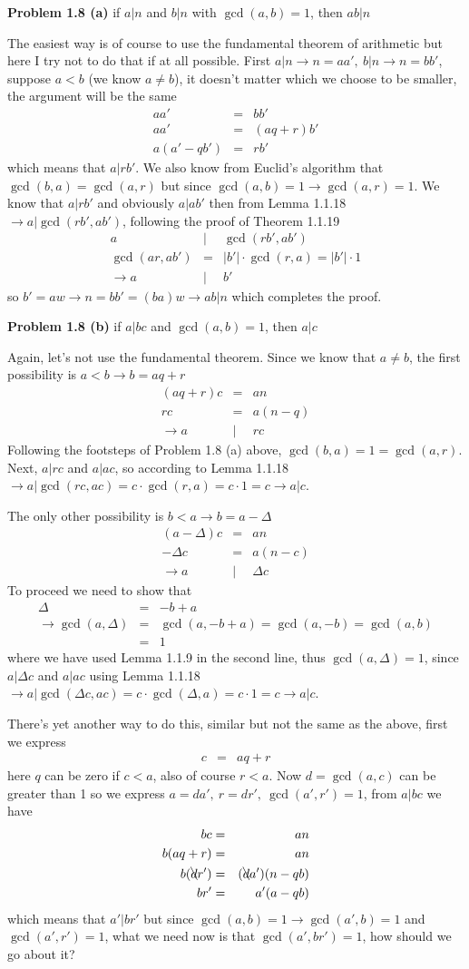 \documentclass[aps,preprint,preprintnumbers,nofootinbib,showpacs,prd]{revtex4-1}
\newcommand{\nbea}{\begin{eqnarray*}}
\newcommand{\neea}{\end{eqnarray*}}
\begin{document}
{\bf Problem 1.8 (a)} if $a|n$ and $b|n$ with $\gcd(a,b)=1$, then $ab|n$

The easiest way is of course to use the fundamental theorem of arithmetic but here I try not to do that if at all possible. First $a|n \to n = aa',~b|n \to n = bb'$, suppose $a < b$ (we know $a \neq b$), it doesn't matter which we choose to be smaller, the argument will be the same
%
\nbea
aa' & = & bb' \\
aa' & = & (aq + r) b' \\
a (a' - qb') & = & rb'
\neea
%
which means that $a | rb'$. We also know from Euclid's algorithm that $\gcd(b,a) = \gcd(a, r)$ but since $\gcd(a,b) = 1 \to \gcd(a,r)=1$. We know that $a|rb'$ and obviously $a|ab'$ then from Lemma 1.1.18 $\to a|\gcd(rb',ab')$, following the proof of Theorem 1.1.19
%
\nbea
a & | & \gcd(rb',ab') \\
\gcd(ar,ab') & = & |b'| \cdot \gcd(r,a) = |b'| \cdot 1 \\
\to a & | & b'
\neea
%
so $b' = a w \to n = bb' = (b a) w \to ab | n$ which completes the proof.

{\bf Problem 1.8 (b)} if $a|bc$ and $\gcd(a,b) = 1$, then $a|c$

Again, let's not use the fundamental theorem. Since we know that $a \neq b$, the first possibility is $a < b \to b = aq + r$
%
\nbea
(aq+r)c & = & an \\
rc & = & a(n-q) \\
\to a & | & rc
\neea
%
Following the footsteps of Problem 1.8 (a) above, $\gcd(b,a) = 1 = \gcd(a,r)$. Next, $a|rc$ and $a|ac$, so according to Lemma 1.1.18 $\to a|\gcd(rc,ac) = c \cdot \gcd(r,a) = c \cdot 1 = c \to a | c$.

The only other possibility is $b < a \to b = a - \Delta$
%
\nbea
(a - \Delta)c & = & an \\
-\Delta c & = & a(n-c) \\
\to a & | & \Delta c
\neea
%
To proceed we need to show that
%
\nbea
\Delta & = & - b + a\\
\to \gcd(a,\Delta) & = & \gcd(a, - b + a) = \gcd(a,-b) = \gcd(a,b)\\
& = & 1
\neea
%
where we have used Lemma 1.1.9 in the second line, thus $\gcd(a,\Delta) = 1$, since $a|\Delta c$ and $a|ac$ using Lemma 1.1.18 $\to a|\gcd(\Delta c,ac) = c \cdot \gcd(\Delta,a) = c \cdot 1 = c \to a|c$.

There's yet another way to do this, similar but not the same as the above, first we express
%
\nbea
c & = & aq + r
\neea
%
here $q$ can be zero if $c < a$, also of course $r < a$. Now $d = \gcd(a,c)$ can be greater than 1 so we express $a = da',~r = dr',~\gcd(a',r')=1$, from $a|bc$ we have
%
\nbea
bc & = & an \\
b (aq + r) & = & an \\
b(\bcancel{d}r') & = & (\bcancel{d}a')(n - qb) \\
br' & = & a'(a - qb)
\neea
%
which means that $a'|br'$ but since $\gcd(a,b) = 1 \to \gcd(a',b) = 1$ and $\gcd(a',r') = 1$, what we need now is that $\gcd(a',br') = 1$, how should we go about it?
\end{document}
